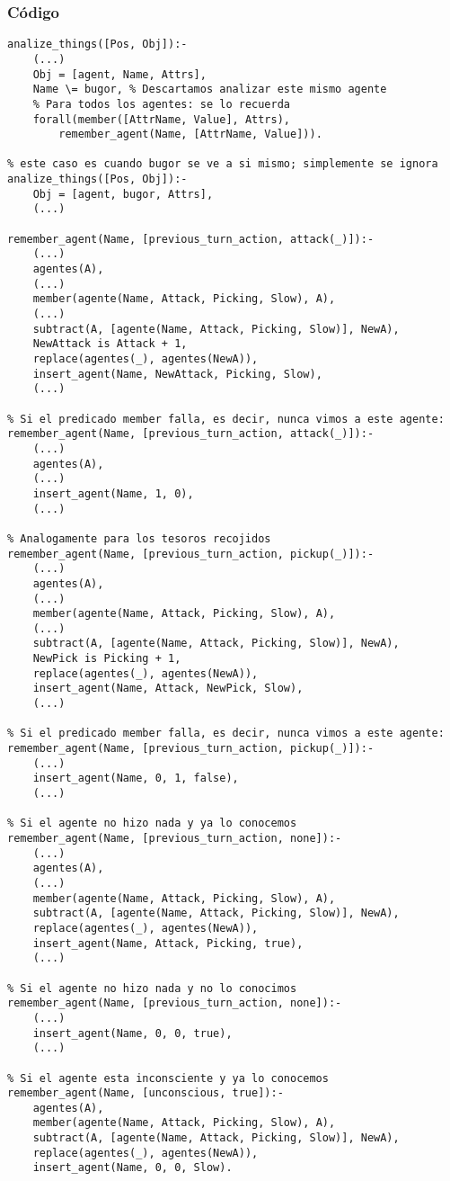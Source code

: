 \documentclass[a4paper,10pt,spanish]{article}
\begin{document}
	\subsubsection{C\'odigo}
	
	\begin{lstlisting}
analize_things([Pos, Obj]):- 
	(...)
	Obj = [agent, Name, Attrs],
	Name \= bugor, % Descartamos analizar este mismo agente
	% Para todos los agentes: se lo recuerda
	forall(member([AttrName, Value], Attrs), 
		remember_agent(Name, [AttrName, Value])).

% este caso es cuando bugor se ve a si mismo; simplemente se ignora
analize_things([Pos, Obj]):- 
	Obj = [agent, bugor, Attrs],
	(...)

remember_agent(Name, [previous_turn_action, attack(_)]):- 
	(...)
	agentes(A),
	(...)
	member(agente(Name, Attack, Picking, Slow), A),
	(...)
	subtract(A, [agente(Name, Attack, Picking, Slow)], NewA),
	NewAttack is Attack + 1,
	replace(agentes(_), agentes(NewA)),
	insert_agent(Name, NewAttack, Picking, Slow),
	(...)

% Si el predicado member falla, es decir, nunca vimos a este agente:
remember_agent(Name, [previous_turn_action, attack(_)]):- 
	(...)
	agentes(A),
	(...)
	insert_agent(Name, 1, 0),
	(...)

% Analogamente para los tesoros recojidos
remember_agent(Name, [previous_turn_action, pickup(_)]):- 
	(...)
	agentes(A),
	(...)
	member(agente(Name, Attack, Picking, Slow), A),
	(...)
	subtract(A, [agente(Name, Attack, Picking, Slow)], NewA),
	NewPick is Picking + 1,
	replace(agentes(_), agentes(NewA)),
	insert_agent(Name, Attack, NewPick, Slow),
	(...)

% Si el predicado member falla, es decir, nunca vimos a este agente:
remember_agent(Name, [previous_turn_action, pickup(_)]):- 
	(...)
	insert_agent(Name, 0, 1, false),
	(...)

% Si el agente no hizo nada y ya lo conocemos
remember_agent(Name, [previous_turn_action, none]):- 
	(...)
	agentes(A),
	(...)
	member(agente(Name, Attack, Picking, Slow), A),
	subtract(A, [agente(Name, Attack, Picking, Slow)], NewA),
	replace(agentes(_), agentes(NewA)),
	insert_agent(Name, Attack, Picking, true),
	(...)

% Si el agente no hizo nada y no lo conocimos
remember_agent(Name, [previous_turn_action, none]):- 
	(...)
	insert_agent(Name, 0, 0, true),
	(...)
	
% Si el agente esta inconsciente y ya lo conocemos
remember_agent(Name, [unconscious, true]):-
	agentes(A),
	member(agente(Name, Attack, Picking, Slow), A),
	subtract(A, [agente(Name, Attack, Picking, Slow)], NewA),
	replace(agentes(_), agentes(NewA)),
	insert_agent(Name, 0, 0, Slow).


\end{lstlisting}
\end{document}
